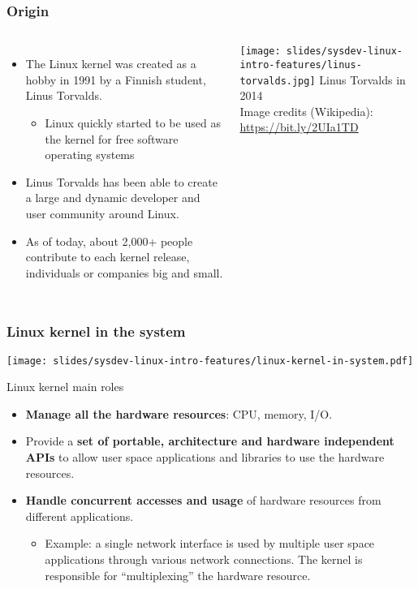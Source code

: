   \begin{frame}
  \frametitle{Origin}
  \begin{columns}
    \begin{itemize}
    \item The Linux kernel was created as a hobby in 1991 by a Finnish
      student, Linus Torvalds.
      \begin{itemize}
      \item Linux quickly started to be used as the kernel for free
        software operating systems
      \end{itemize}
    \item Linus Torvalds has been able to create a large and dynamic
      developer and user community around Linux.
    \item As of today, about 2,000+ people contribute to each kernel
      release, individuals or companies big and small.
    \end{itemize}
      \texttt{[image: slides/sysdev-linux-intro-features/linus-torvalds.jpg]}
      \scriptsize
      Linus Torvalds in 2014\\
      \tiny
      Image credits (Wikipedia):\\
      \url{https://bit.ly/2UIa1TD}
    \end{columns}
\end{frame}

\begin{frame}
  \frametitle{Linux kernel in the system}
  \begin{center}
    \texttt{[image: slides/sysdev-linux-intro-features/linux-kernel-in-system.pdf]}
  \end{center}
\end{frame}

\begin{frame}{Linux kernel main roles}
  \begin{itemize}
  \item {\bf Manage all the hardware resources}: CPU, memory, I/O.
  \item Provide a {\bf set of portable, architecture and hardware
      independent APIs} to allow user space applications and libraries
    to use the hardware resources.
  \item {\bf Handle concurrent accesses and usage} of hardware
    resources from different applications.
    \begin{itemize}
    \item Example: a single network interface is used by multiple
      user space applications through various network connections. The
      kernel is responsible for ``multiplexing'' the hardware resource.
    \end{itemize}
  \end{itemize}
\end{frame}

